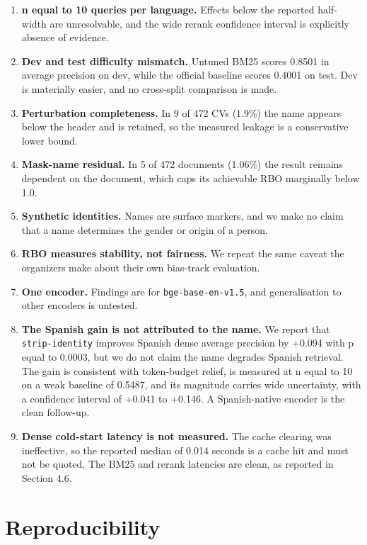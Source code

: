 \documentclass{ceurart}
\begin{document}
\begin{enumerate}
  \item \textbf{n equal to 10 queries per language.} Effects below the reported half-width
  are unresolvable, and the wide rerank confidence interval is explicitly absence of
  evidence.
  \item \textbf{Dev and test difficulty mismatch.} Untuned BM25 scores 0.8501 in average
  precision on dev, while the official baseline scores 0.4001 on test. Dev is materially
  easier, and no cross-split comparison is made.
  \item \textbf{Perturbation completeness.} In 9 of 472 CVs (1.9\%) the name appears below
  the header and is retained, so the measured leakage is a conservative lower bound.
  \item \textbf{Mask-name residual.} In 5 of 472 documents (1.06\%) the result remains
  dependent on the document, which caps its achievable RBO marginally below 1.0.
  \item \textbf{Synthetic identities.} Names are surface markers, and we make no claim that
  a name determines the gender or origin of a person.
  \item \textbf{RBO measures stability, not fairness.} We repeat the same caveat the
  organizers make about their own bias-track evaluation.
  \item \textbf{One encoder.} Findings are for \texttt{bge-base-en-v1.5}, and
  generalisation to other encoders is untested.
  \item \textbf{The Spanish gain is not attributed to the name.} We report that
  \texttt{strip-identity} improves Spanish dense average precision by +0.094 with p equal
  to 0.0003, but we do not claim the name degrades Spanish retrieval. The gain is
  consistent with token-budget relief, is measured at n equal to 10 on a weak baseline of
  0.5487, and its magnitude carries wide uncertainty, with a confidence interval of +0.041
  to +0.146. A Spanish-native encoder is the clean follow-up.
  \item \textbf{Dense cold-start latency is not measured.} The cache clearing was
  ineffective, so the reported median of 0.014 seconds is a cache hit and must not be
  quoted. The BM25 and rerank latencies are clean, as reported in Section 4.6.
\end{enumerate}

\section{Reproducibility}
\end{document}
